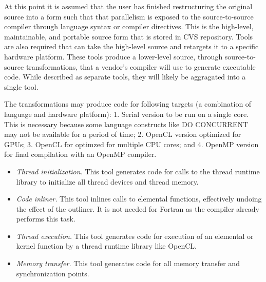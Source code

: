 At this point it is assumed that the user has finished restructuring the
original source into a form such that that parallelism is exposed to the
source-to-source compiler through language syntax or compiler directives.  This
is the high-level, maintainable, and portable source form that is stored in CVS
repository.  Tools are also required that can take the high-level source and
retargets it to a specific hardware platform.  These tools produce a lower-level
source, through source-to-source transformations, that a vendor's compiler will
use to generate executable code.  While described as separate tools, they will
likely be aggragated into a single tool.

The transformations may produce code for following targets (a combination of
language and hardware platform): 1. Serial version to be run on a single core.
This is necessary because some language constructs like DO CONCURRENT may not be
available for a period of time; 2. OpenCL version optimized for GPUs; 3. OpenCL
for optimzed for multiple CPU cores; and 4. OpenMP version for final compilation
with an OpenMP compiler.


\begin{itemize}

\item \emph{Thread initialization.} This tool generates code for calls to the
thread runtime library to initialize all thread devices and thread memory.

\item \emph{Code inliner.} This tool inlines calls to elemental functions,
effectively undoing the effect of the outliner. It is not needed for Fortran as
the compiler already performs this task.

\item \emph{Thread execution.} This tool generates code for execution of an
elemental or kernel function by a thread runtime library like OpenCL.

\item \emph{Memory transfer.}  This tool generates code for all memory transfer
and synchronization points.

\end{itemize}
